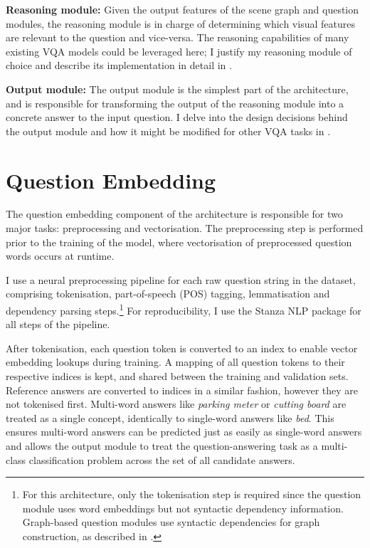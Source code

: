\textbf{Reasoning module:} Given the output features of the scene graph and question modules, the reasoning module is in charge of determining which visual features are relevant to the question and vice-versa. The reasoning capabilities of many existing VQA models could be leveraged here; I justify my reasoning module of choice and describe its implementation in detail in \sectionautorefname{ \ref{section:reasoning_module}}.

\textbf{Output module:} The output module is the simplest part of the architecture, and is responsible for transforming the output of the reasoning module into a concrete answer to the input question. I delve into the design decisions behind the output module and how it might be modified for other VQA tasks in \sectionautorefname{ \ref{section:output_module}}.

\section{Question Embedding}
\label{section:question_embedding}

The question embedding component of the architecture is responsible for two major tasks: preprocessing and vectorisation. The preprocessing step is performed prior to the training of the model, where vectorisation of preprocessed question words occurs at runtime. 

I use a neural preprocessing pipeline for each raw question string in the dataset, comprising tokenisation, part-of-speech (POS) tagging, lemmatisation and dependency parsing steps.\footnote{For this architecture, only the tokenisation step is required since the question module uses word embeddings but not syntactic dependency information. Graph-based question modules use syntactic dependencies for graph construction, as described in \sectionautorefname{ \ref{sec:ablation_studies}}.} For reproducibility, I use the Stanza NLP package \cite{qi2020stanza} for all steps of the pipeline.

After tokenisation, each question token is converted to an index to enable vector embedding lookups during training. A mapping of all question tokens to their respective indices is kept, and shared between the training and validation sets. Reference answers are converted to indices in a similar fashion, however they are not tokenised first. Multi-word answers like \textit{parking meter} or \textit{cutting board} are treated as a single concept, identically to single-word answers like \textit{bed}. This ensures  multi-word answers can be predicted just as easily as single-word answers and allows the output module to treat the question-answering task as a multi-class classification problem across the set of all candidate answers.

